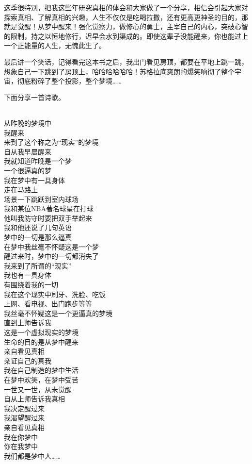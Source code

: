这季很特别，把我这些年研究真相的体会和大家做了一个分享，相信会引起大家对探索真相、了解真相的兴趣，人生不仅仅是吃喝拉撒，还有更高更神圣的目的，那就是觉醒！从梦中醒来！强化觉察力，做修心的勇士，主宰自己的内心，突破心智的限制，持之以恒地修行，迟早会水到渠成的。即使这辈子没能醒来，你也能过上一个正能量的人生，无愧此生了。

最后讲一个笑话，记得看完这本书之后，我出门看见房顶，都要在平地上跳一跳，想象自己一下跳到了房顶上，哈哈哈哈哈哈！苏格拉底爽朗的爆笑响彻了整个宇宙，彻底粉碎了整个投影，整个梦境……

下面分享一首诗歌。

\begin{poem}[梦中人]
    \begin{multicols}{2}
        \begin{center}~\\
            从昨晚的梦境中 \\ 我醒来 \\ 来到了这个称之为“现实”的梦境 \\ 自从我早晨醒来 \\ 我就知道昨晚是一个梦 \\ 一个很逼真的梦 \\ 我在梦中有一具身体 \\ 走在马路上 \\ 场景一下跳跃到室内球场 \\ 我和某位NBA著名球星在打球 \\ 他叫我防守时要把双手举起来 \\ 我和他还说了几句英语 \\ 梦中的一切是那么逼真 \\ 在梦中我丝毫不怀疑这是一个梦 \\ 醒过来时，梦中的一切都消失了 \\ 我来到了所谓的“现实” \\ 我也有一具身体 \\ 有围绕着我的一切 \\ 我在这个现实中刷牙、洗脸、吃饭 \\ 上网、看电视、出门跑步等等 \\ 我丝毫不怀疑这是一个更逼真的梦境 \\ 直到上师告诉我 \\ 这是一个虚拟现实的梦境 \\ 生命的目的是从梦中醒来 \\ 亲自看见真相 \\ 亲证自己的真我 \\ 我在自己制造的梦中生活 \\ 在梦中欢笑，在梦中受苦 \\ 一世又一世，从未觉醒 \\ 自从上师告诉我真相 \\ 我决定醒过来 \\ 我渴望醒过来 \\ 亲自看见真相 \\ 我在你梦中 \\ 你在我梦中 \\ 我们都是梦中人……
        \end{center}
    \end{multicols}
\end{poem}

